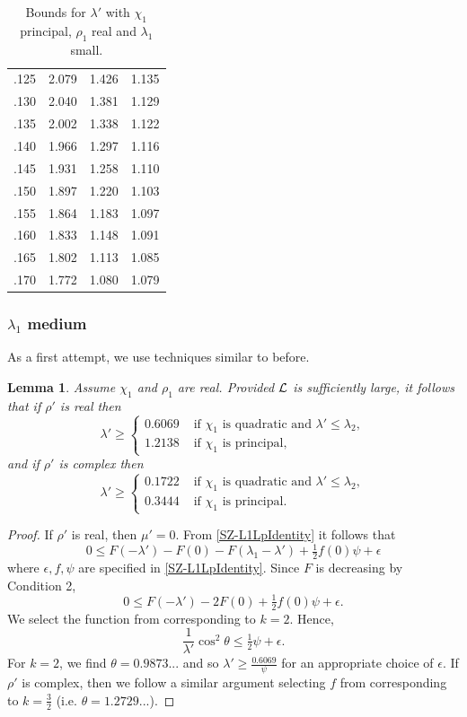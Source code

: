\documentclass[12pt,psamsfonts]{amsart}
\newtheorem{lem}[thm]{Lemma}
\theoremstyle{definition}
\theoremstyle{remark}
\numberwithin{equation}{section}
\begin{document}
\begin{table}
\begin{tabular}{l|c|c|c}
 .125 &  2.079 &  1.426 &  1.135 \\ 
 .130 &  2.040 &  1.381 &  1.129 \\ 
 .135 &  2.002 &  1.338 &  1.122 \\ 
 .140 &  1.966 &  1.297 &  1.116 \\ 
 .145 &  1.931 &  1.258 &  1.110 \\ 
 .150 &  1.897 &  1.220 &  1.103 \\ 
 .155 &  1.864 &  1.183 &  1.097 \\ 
 .160 &  1.833 &  1.148 &  1.091 \\ 
 .165 &  1.802 &  1.113 &  1.085 \\ 
 .170 &  1.772 &  1.080 &  1.079 
\end{tabular}


\caption{Bounds for $\lambda'$ with $\chi_1$ principal, $\rho_1$ real and $\lambda_1$ small.}
\label{Table-SZ-L1LpSmall-Principal}
\end{table}

\subsubsection{$\lambda_1$ medium}

 As a first attempt, we use techniques similar to before. 

\begin{lem} \label{SZ-L1Lpmed-0} Assume $\chi_1$ and $\rho_1$ are real.   Provided $\mathcal{L}$ is sufficiently large, it follows that if $\rho'$ is real then
\[
\lambda' \geq 
\begin{cases} 
0.6069 &\text{ if } \chi_1 \text{ is quadratic and } \lambda' \leq \lambda_2, \\ 
1.2138 & \text{ if } \chi_1 \text{ is principal}, 
\end{cases}
\]
and if $\rho'$ is complex then
\[
\lambda' \geq
\begin{cases} 
0.1722 & \text{ if } \chi_1 \text{ is quadratic and } \lambda' \leq \lambda_2,
\\ 0.3444 & \text{ if } \chi_1 \text{ is principal}. 
\end{cases}
\]
\end{lem}
\begin{proof} If $\rho'$ is real, then $\mu' = 0$. From \cref{SZ-L1LpIdentity} it follows that
\[
0 \leq F(-\lambda') - F(0) - F(\lambda_1-\lambda') + \tfrac{1}{2} f(0)\psi + \epsilon
\]
where $\epsilon, f, \psi$ are specified in \cref{SZ-L1LpIdentity}. Since $F$ is decreasing by Condition 2, 
\[
0 \leq F(-\lambda') - 2F(0) + \tfrac{1}{2} f(0)\psi + \epsilon.
\]
We select the function from \cite[Lemma 7.5]{HBLinnik} corresponding to $k=2$. Hence,
\[
\frac{1}{\lambda'} \cos^2 \theta 	\leq \tfrac{1}{2}\psi + \epsilon.
\]
For $k =2$, we find $\theta = 0.9873...$ and so $\lambda' \geq \frac{0.6069}{\psi}$ for an appropriate choice of $\epsilon$. If $\rho'$ is complex, then we follow a similar argument  selecting $f$ from \cite[Lemma 7.5]{HBLinnik} corresponding to $k=\tfrac{3}{2}$ (i.e. $\theta = 1.2729...$).
\end{proof}
\end{document}
